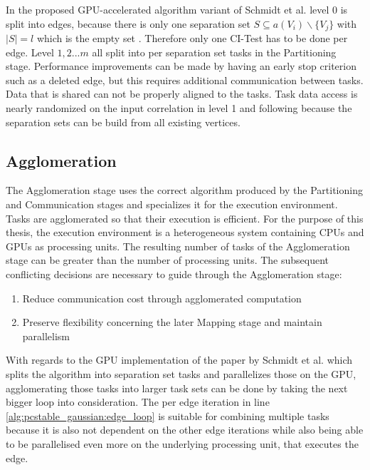 In the proposed GPU-accelerated algorithm variant of Schmidt et al. \cite{schmidtOrderIndependentConstraintBasedCausal2018} level 0 is split into edges, because there is only one separation set $S \subseteq a(V_i ) \backslash \{V_j\}$ with $| S | = l$ which is the empty set ${}$. Therefore only one CI-Test has to be done per edge.
Level $1,2 ... m$ all split into per separation set tasks in the Partitioning stage. Performance improvements can be made by having an early stop criterion such as a deleted edge, but this requires additional communication between tasks. Data that is shared can not be properly aligned to the tasks. Task data access is nearly randomized on the input correlation in level 1 and following because the separation sets can be build from all existing vertices. 

    
\subsection{Agglomeration}
The Agglomeration stage uses the correct algorithm produced by the Partitioning and Communication stages and specializes it for the execution environment. Tasks are agglomerated so that their execution is efficient. For the purpose of this thesis, the execution environment is a heterogeneous system containing CPUs and GPUs as processing units. The resulting number of tasks of the Agglomeration stage can be greater than the number of processing units. The subsequent conflicting decisions are necessary to guide through the Agglomeration stage:

\begin{enumerate}
    \item Reduce communication cost through agglomerated computation
    \item Preserve flexibility concerning the later Mapping stage and maintain parallelism
\end{enumerate}

With regards to the GPU implementation of the paper by Schmidt et al. \cite{schmidtOrderIndependentConstraintBasedCausal2018} which splits the algorithm into separation set tasks and parallelizes those on the GPU, agglomerating those tasks into larger task sets can be done by 
taking the next bigger loop into consideration. The per edge iteration in line \ref{alg:pcstable_gaussian:edge_loop} is suitable for combining multiple tasks because it is also not dependent on the other edge iterations while also being able to be parallelised even more on the underlying processing unit, that executes the edge.

